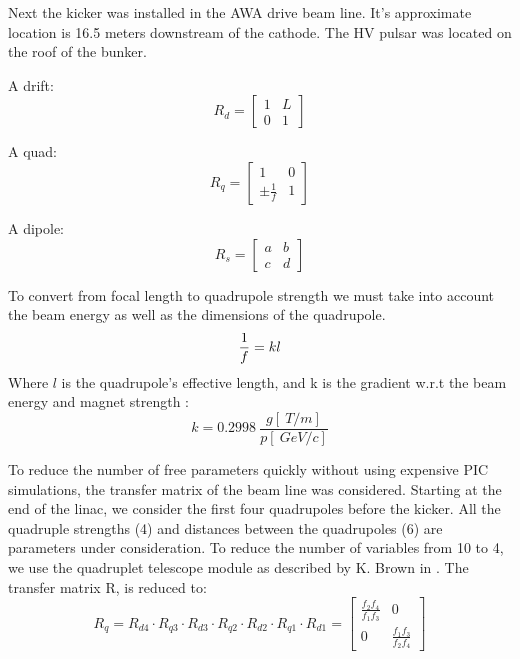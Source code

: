 
Next the kicker was installed in the AWA drive beam line.
It's approximate location is 16.5 meters downstream of the cathode.
The HV pulsar was located on the roof of the bunker.




A drift: 
\begin{equation}
R_d = 
\begin{bmatrix}
1 & L \\
0 & 1
\end{bmatrix}
\end{equation}

A quad: 
\begin{equation}
R_q = 
\begin{bmatrix}
1 & 0 \\
\pm \frac{1}{f} & 1
\end{bmatrix}
\end{equation}

A dipole:
\begin{equation}
R_s = 
\begin{bmatrix}
a & b \\
c & d
\end{bmatrix}
\end{equation}

To convert from focal length to quadrupole strength we must take into account the 
beam energy as well as the dimensions of the quadrupole. 
\begin{equation}
	\frac{1}{f} = kl \\
\end{equation}
Where $l$ is the quadrupole's effective length, and k is the gradient w.r.t 
the beam energy and magnet strength \cite{Wiedemann}:
\begin{equation}
	k = \SI{0.2998}{} \frac{g[\SI{}{T/m}]}{p [\SI{}{GeV/c}]}\label{k}
\end{equation}



 To reduce the number of free parameters quickly without using expensive PIC simulations, 
 the transfer matrix of the beam line was considered. Starting at the end of the linac, 
 we consider the first four quadrupoles before the kicker. All the quadruple strengths (4) and
 distances between the quadrupoles (6) are parameters under consideration. To reduce the number
 of variables from 10 to 4, we use the quadruplet telescope module as described by K. Brown in \cite{brown}.  The transfer matrix R, is reduced to:  
 \begin{equation}
 R_q = R_{d4} \cdot R_{q3} \cdot R_{d3} \cdot R_{q2} \cdot R_{d2} \cdot R_{q1} \cdot R_{d1} = 
 \begin{bmatrix}
 \frac{f_2 f_4}{f_1 f_3} & 0 \\
 0 & \frac{f_1 f_3}{f_2 f_4}	
 \end{bmatrix}\label{kb1}
 \end{equation}

